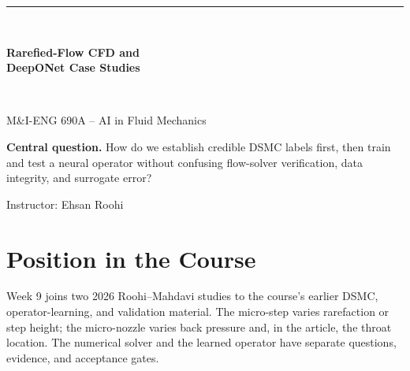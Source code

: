 \documentclass[11pt]{article}
\begin{document}
\hypersetup{pageanchor=false}
\begin{titlepage}
\centering\vspace*{0.8cm}
{\color{black}\rule{\textwidth}{2pt}}\\[0.45cm]
{\Huge\bfseries Rarefied-Flow CFD and\\[0.16cm]DeepONet Case Studies\par}
\vspace{0.32cm}{\Large Micro-Step and Micro-Nozzle: from DSMC verification to held-out fields\par}
\vspace{0.32cm}{\large Week 9 Extension Lecture Notes\par}
\vspace{0.48cm}{\color{black}\rule{\textwidth}{2pt}}\\[0.8cm]
{\Large M\&I-ENG 690A -- AI in Fluid Mechanics\par}
\vspace{0.2cm}{\large Summer 2026\par}
\vfill
\begin{tcolorbox}[colback=lightblue,colframe=blue,width=0.92\textwidth]
\textbf{Central question.} How do we establish credible DSMC labels first, then train and test a neural operator without confusing flow-solver verification, data integrity, and surrogate error?
\end{tcolorbox}
\vfill{\large Instructor: Ehsan Roohi\par}
\end{titlepage}

\hypersetup{pageanchor=true}
\tableofcontents\newpage
{}

\section{Position in the Course}
Week 9 joins two 2026 Roohi--Mahdavi studies to the course's earlier DSMC,
operator-learning, and validation material. The micro-step varies rarefaction
or step height; the micro-nozzle varies back pressure and, in the article, the
throat location. The numerical solver and the learned operator have separate
questions, evidence, and acceptance gates.
\end{document}

